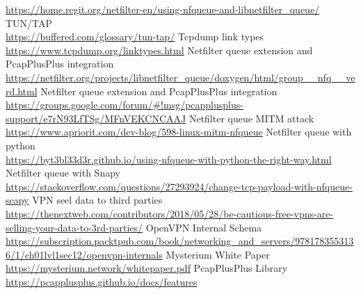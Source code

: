 \documentclass[12pt]{article}
\begin{document}
\begin{thebibliography}{1}
			\url{https://home.regit.org/netfilter-en/using-nfqueue-and-libnetfilter_queue/}
			TUN/TAP\\
			\url{https://buffered.com/glossary/tun-tap/}
			Tcpdump link types\\
			\url{https://www.tcpdump.org/linktypes.html}
			Netfilter queue extension and PcapPlusPlus integration\\
			\url{https://netfilter.org/projects/libnetfilter_queue/doxygen/html/group__nfq__verd.html}
			Netfilter queue extension and PcapPlusPlus integration\\
			\url{https://groups.google.com/forum/#!msg/pcapplusplus-support/e7rN93LfTSg/MFnVEKCNCAAJ}
			Netfilter queue MITM attack\\
			\url{https://www.apriorit.com/dev-blog/598-linux-mitm-nfqueue}
			Netfilter queue with python\\
			\url{https://byt3bl33d3r.github.io/using-nfqueue-with-python-the-right-way.html}
			Netfilter queue with Snapy	\\		
			\url{https://stackoverflow.com/questions/27293924/change-tcp-payload-with-nfqueue-scapy}
			VPN seel data to third parties\\
			\url{https://thenextweb.com/contributors/2018/05/28/be-cautious-free-vpns-are-selling-your-data-to-3rd-parties/}
			OpenVPN Internal Schema\\
			\url{https://subscription.packtpub.com/book/networking_and_servers/9781783553136/1/ch01lvl1sec12/openvpn-internals}
			Mysterium White Paper\\
			\url{https://mysterium.network/whitepaper.pdf}
			PcapPlusPlus Library\\
			\url{https://pcapplusplus.github.io/docs/features}

	\end{thebibliography}
		
	\pagebreak
	
	
\end{document}

